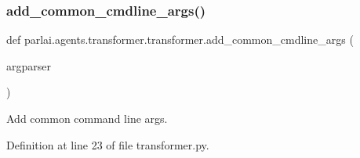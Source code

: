 \subsubsection{\texorpdfstring{add\+\_\+common\+\_\+cmdline\+\_\+args()}{add\_common\_cmdline\_args()}}
{\footnotesize\ttfamily def parlai.\+agents.\+transformer.\+transformer.\+add\+\_\+common\+\_\+cmdline\+\_\+args (\begin{DoxyParamCaption}\item[{}]{argparser }\end{DoxyParamCaption})}

\begin{DoxyVerb}Add common command line args.
\end{DoxyVerb}
 

Definition at line 23 of file transformer.\+py.


